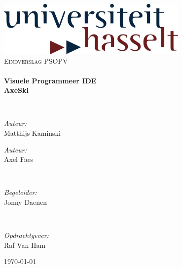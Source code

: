 \documentclass[]{article}
\begin{document}
\begin{titlepage}
\begin{center}

\includegraphics[width=0.7\textwidth]{./TitlePage/logo_UHasselt.png}~\\[1cm]

\textsc{\Large Eindverslag PSOPV}\\[0.5cm]

\HRule \\[0.4cm]
{ \huge \bfseries Visuele Programmeer IDE \\ AxeSki \\[0.4cm] }

\HRule \\[1.5cm]

\noindent
\begin{minipage}{0.4\textwidth}
	\begin{flushleft} \large
	\emph{Auteur:}\\
	Matthijs Kaminski
	\end{flushleft}
	\end{minipage}%
\begin{minipage}{0.4\textwidth}
	\begin{flushright} \large
	\emph{Auteur:} \\
	Axel Faes
	\end{flushright}
\end{minipage}
\\[1cm]
\begin{minipage}{0.4\textwidth}
	\begin{center} \large
	\emph{Begeleider: } \\
	Jonny Daenen 
	\end{center} \large
\end{minipage}
\\[1cm]
\begin{minipage}{0.4\textwidth}
	\begin{center} \large
	\emph{Opdrachtgever:} \\
	Raf Van Ham
	\end{center}
\end{minipage}

\vfill

{\large \today}

\end{center}
\end{titlepage}
\end{document}
